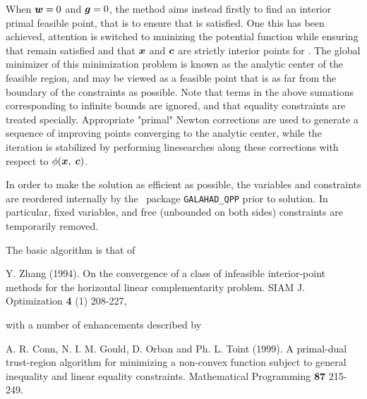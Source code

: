 \documentclass{galahad}
\begin{document}
When ${\bm{w}} = 0$ and ${\bm{g}} = 0$, the method aims instead firstly to find an 
interior primal feasible point, that is to ensure that  is satisfied. 
One this has been achieved, attention is switched to mninizing the
potential function
while ensuring that  remain satisfied and that 
${\bm{x}}$ and ${\bm{c}}$ are strictly interior points for . 
The global minimizer of this minimization problem is known as the
analytic center of the feasible region, and may be viewed as
a feasible point that is as far from the boundary of the constraints as 
possible.
Note that terms in the above sumations corresponding to infinite bounds are
ignored, and that equality constraints are treated specially.
Appropriate "primal" Newton corrections are used to generate a sequence
of improving points converging to the analytic center, while the iteration
is stabilized by performing linesearches along these corrections with respect 
to $\phi ({\bm{x}},\;{\bm{c}})$.

In order to make the solution as efficient as possible, the 
variables and constraints are reordered internally
by the \galahad\ package {\tt GALAHAD\_QPP} prior to solution. 
In particular, fixed variables, and 
free (unbounded on both sides) constraints are temporarily removed.
\vspace*{1mm}

\galreferences
\vspace*{1mm}

\noindent
The basic algorithm is that of
\vspace*{1mm}

\noindent
Y. Zhang (1994).
On the convergence of a class of infeasible interior-point methods for the
horizontal linear complementarity problem.
SIAM J. Optimization {\bf 4} (1) 208-227,
\vspace*{1mm}

\noindent
with a number of enhancements described by
\vspace*{1mm}

\noindent
A. R. Conn, N. I. M. Gould, D. Orban and Ph. L. Toint (1999).
A primal-dual trust-region algorithm for minimizing a non-convex 
function subject to general inequality and linear equality constraints.
Mathematical Programming {\bf 87} 215-249.

\end{document}
